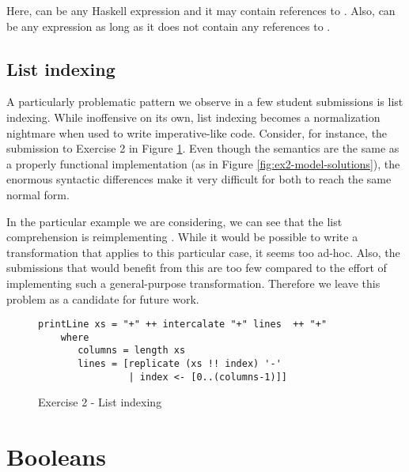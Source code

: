 Here,  can be any Haskell expression and it may contain references to . Also,  can be any expression as long as it does not contain any references to .

\subsection{List indexing}

A particularly problematic pattern we observe in a few student submissions is list indexing. While inoffensive on its own, list indexing becomes a normalization nightmare when used to write imperative-like code. Consider, for instance, the submission to Exercise 2 in Figure \ref{fig:ex2-list-indexing}. Even though the semantics are the same as a properly functional implementation (as in Figure \ref{fig:ex2-model-solutions}), the enormous syntactic differences make it very difficult for both to reach the same normal form.

In the particular example we are considering, we can see that the list comprehension is reimplementing . While it would be possible to write a transformation that applies to this particular case, it seems too ad-hoc. Also, the submissions that would benefit from this are too few compared to the effort of implementing such a general-purpose transformation. Therefore we leave this problem as a candidate for future work.


\begin{figure}
\centering
\begin{verbatim}
printLine xs = "+" ++ intercalate "+" lines  ++ "+"
    where
       columns = length xs
       lines = [replicate (xs !! index) '-'
                | index <- [0..(columns-1)]]
\end{verbatim}
\caption{Exercise 2 - List indexing}
\label{fig:ex2-list-indexing}
\end{figure}

\section{Booleans}




